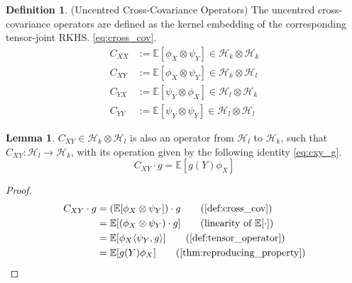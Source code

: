 \documentclass[twoside]{article} \usepackage{aistats2017}
\theoremstyle{definition}
\newtheorem{definition}[theorem]{Definition}
\newtheorem{lemma}[theorem]{Lemma}
\newcommand{\rv}[1]{{#1}}
\newcommand{\expect}[1]{{\mathbb{E}[#1]}}
\newcommand{\inner}[2]{{\langle #1, #2 \rangle}}
\newcommand{\Hk}{\mathcal{H}_{k}}
\newcommand{\Hl}{\mathcal{H}_{l}}
\newcommand{\phiX}{\phi_{\rv{X}}}
\newcommand{\psiY}{\psi_{\rv{Y}}}
\newcommand{\Cxy}{C_{\rv{X} \rv{Y}}}
\newcommand{\Cyx}{C_{\rv{Y} \rv{X}}}
\newcommand{\Cxx}{C_{\rv{X} \rv{X}}}
\newcommand{\Cyy}{C_{\rv{Y} \rv{Y}}}
\begin{document}
		\begin{definition} \label{def:cross_cov}
			(Uncentred Cross-Covariance Operators)
			The uncentred cross-covariance operators are defined as the kernel embedding of the corresponding tensor-joint RKHS. \eqref{eq:cross_cov}.
			\begin{equation}
			\begin{aligned}
				\Cxx &:= \expect{\phiX \otimes \psiY} \in \Hk \otimes \Hk \\
				\Cxy &:= \expect{\phiX \otimes \psiY} \in \Hk \otimes \Hl \\
				\Cyx &:= \expect{\psiY \otimes \phiX} \in \Hl \otimes \Hk \\
				\Cyy &:= \expect{\psiY \otimes \psiY} \in \Hl \otimes \Hl 
			\label{eq:cross_cov}
			\end{aligned}
			\end{equation}		
		\end{definition}
	
		\begin{lemma} \label{thm:cxy_g}
			$\Cxy \in \mathcal{H}_{k} \otimes \mathcal{H}_{l}$ is also an operator from $\Hl$ to $\Hk$, such that $\Cxy : \Hl \to \Hk$, with its operation given by the following identity \eqref{eq:cxy_g}.
			\begin{equation}
				\Cxy \cdot g = \expect{g(\rv{Y}) \phiX}
			\label{eq:cxy_g}
			\end{equation}
		
			\begin{proof}
			\begin{align*}
				\Cxy \cdot g &=  (\expect{\phiX \otimes \psiY}) \cdot g \tag{\cref{def:cross_cov}} \\
				&= \expect{(\phiX \otimes \psiY) \cdot g} \tag{linearity of $\expect{\cdot}$} \\
				&= \expect{\phiX \inner{\psiY}{g}} \tag{\cref{def:tensor_operator}} \\
				&= \expect{g(\rv{Y}) \phiX} \tag{\cref{thm:reproducing_property}}
			\end{align*}
			\end{proof}
		\end{lemma}
			
\end{document}
